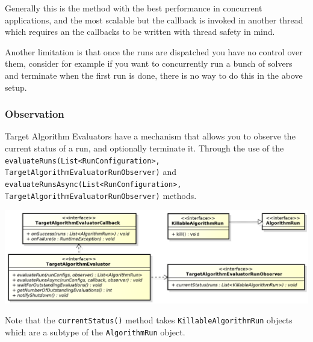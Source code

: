 \documentclass[11pt,letterpaper,oneside]{article}
\begin{document}
Generally this is the method with the best performance in concurrent applications, and the most scalable but the callback is invoked in another thread which requires an the callbacks to be written with thread safety in mind. 

Another limitation is that once the runs are dispatched you have no control over them, consider for example if you want to concurrently run a bunch of solvers and terminate when the first run is done, there is no way to do this in the above setup.

\subsubsection{Observation}

Target Algorithm Evaluators have a mechanism that allows you to observe the current status of a run, and optionally terminate it. Through the use of the \texttt{evaluateRuns(List<RunConfiguration>, TargetAlgorithmEvaluatorRunObserver)} and \texttt{evaluateRunsAsync(List<RunConfiguration>, TargetAlgorithmEvaluatorRunObserver)} methods.


\begin{center}
\includegraphics[scale=0.5]{img/UML/TAEObserver.png}
\end{center}


Note that the \texttt{currentStatus()} method takes \texttt{KillableAlgorithmRun} objects which are a subtype of the \texttt{AlgorithmRun} object.
\end{document}
